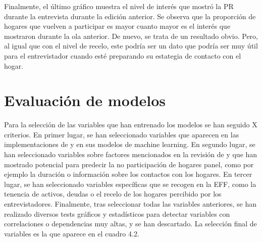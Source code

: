 Finalmente, el último gráfico muestra el nivel de interés que mostró la PR durante la entrevista durante la edición anterior. Se observa que la proporción de hogares que vuelven a participar es mayor cuanto mayor es el interés que mostraron durante la ola anterior. De nuevo, se trata de un resultado obvio. Pero, al igual que con el nivel de recelo, este podría ser un dato que podría ser muy útil para el entrevistador cuando esté preparando su estategia de contacto con el hogar.

\section{Evaluación de modelos}

Para la selección de las variables que han entrenado los modelos se han seguido X criterios. En primer lugar, se han seleccionado variables que aparecen en las implementaciones de \cite{kern2021predicting} y \cite{beste2023case} en sus modelos de machine learning. En segundo lugar, se han seleccionado variables sobre factores mencionados en la revisión de \cite{lynn2018tackling} y que han mostrado potencial para predecir la no participación de hogares panel, como por ejemplo la duración o información sobre los contactos con los hogares. En tercer lugar, se han seleccionado variables específicas que se recogen en la EFF, como la tenencia de activos, deudas o el recelo de los hogares percibido por los entrevistadores. Finalmente, tras seleccionar todas las variables anteriores, se han realizado diversos tests gráficos y estadísticos para detectar variables con correlaciones o dependencias muy altas, y se han descartado. La selección final de variables es la que aparece en el cuadro 4.2.

